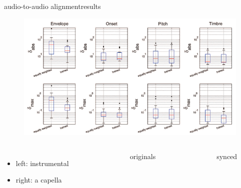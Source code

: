         \begin{frame}{audio-to-audio alignment}{results}
            \begin{figure}
                \centerline{\includegraphics[scale=.5]{graph/ATAA_results}}
            \end{figure}
                \vspace{-10mm}
                \begin{columns}
                        \begin{itemize}
                            \item   left: instrumental
                            \item   right: a capella
                        \end{itemize}
                        \vspace{5mm}
                        \begin{figure}
                        \end{figure}\vspace{-8mm}
                        \begin{center}originals\end{center}

                    \begin{figure}
                    \end{figure}\vspace{-8mm}
                    \begin{center}synced\end{center}
                \end{columns}
        \end{frame}
        
